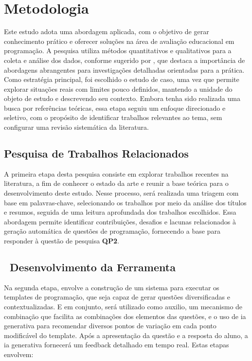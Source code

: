 \chapter{Metodologia}\label{cap:metodologia}

Este estudo adota uma abordagem aplicada, com o objetivo de gerar conhecimento prático e oferecer soluções na área de avaliação educacional em programação. A pesquisa utiliza métodos quantitativos e qualitativos para a coleta e análise dos dados, conforme sugerido por \parencite{Gil2017}, que destaca a importância de abordagens abrangentes para investigações detalhadas orientadas para a prática. Como estratégia principal, foi escolhido o estudo de caso, uma vez que permite explorar situações reais com limites pouco definidos, mantendo a unidade do objeto de estudo e descrevendo seu contexto. Embora tenha sido realizada uma busca por referências teóricas, essa etapa seguiu um enfoque direcionado e seletivo, com o propósito de identificar trabalhos relevantes ao tema, sem configurar uma revisão sistemática da literatura. 

\section{Pesquisa de Trabalhos Relacionados}

A primeira etapa desta pesquisa consiste em explorar trabalhos recentes na literatura, a fim de conhecer o estado da arte e reunir a base teórica para o desenvolvimento deste estudo. Nesse processo, será realizada uma triagem com base em palavras-chave, selecionando os trabalhos por meio da análise dos títulos e resumos, seguida de uma leitura aprofundada dos trabalhos escolhidos. Essa abordagem permite identificar contribuições, desafios e lacunas relacionados à geração automática de questões de programação, fornecendo a base para responder à questão de pesquisa \textbf{QP2}. 


\section{\textbf{ Desenvolvimento da Ferramenta} }
Na segunda etapa, envolve a construção de um sistema para executar os templates de programação, que seja capaz de gerar questões diversificadas e contextualizadas. E em conjunto, será utilizado como auxilio, um mecanismo de combinação que facilita as combinações dos elementos das questões, e o uso de \gls{ia} generativa para recomendar diversos pontos de variação em cada ponto modificável do template. Após a apresentação da questão e a resposta do aluno, a \gls{ia}  generativa fornecerá um feedback detalhado em tempo real. Estas etapas envolvem: 

